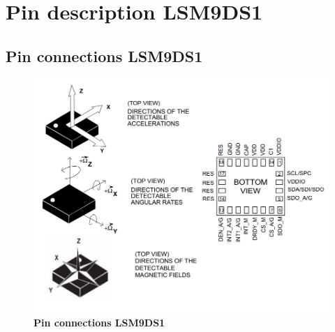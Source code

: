 %
%
%



\chapter{Pin description LSM9DS1}

\section{Pin connections LSM9DS1}

\begin{figure}[h!]
	\centering	\includegraphics[width=\linewidth]{Images/imupin}
	\caption{\textbf{Pin connections LSM9DS1}} 
\end{figure}
\newpage

